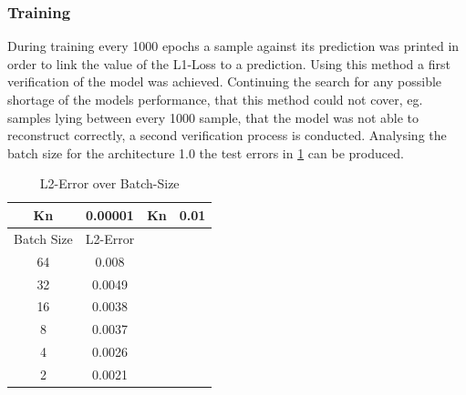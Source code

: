 \documentclass[12pt, a4paper]{article}
\begin{document}
\subsubsection{Training}
During training every 1000 epochs a sample against its prediction was printed in order to link the value of the L1-Loss to a prediction. Using this method a first verification of the model was achieved. Continuing the search for any possible shortage of the models performance, that this method could not cover, eg. samples lying between every 1000 sample, that the model was not able to reconstruct correctly, a second verification process is conducted.
Analysing the batch size for the architecture 1.0 the test errors in \cref{Tab:Batch} can be produced.
\begin{table}[!htbp]\centering
	\begin{tabular}{ |c c|c c| }
		\hline
		Kn & 0.00001& Kn &0.01  \\ [.5ex]
		\hline
		Batch Size & L2-Error && \\ \hline
		64 & 0.008  &&\\ 
		32 & 0.0049 &&\\ \hline
		16 & 0.0038 &&\\ \hline
		8 & 0.0037&&\\ \hline
		4 & 0.0026&&\\ \hline
		2 & 0.0021&&\\
		\hline
	\end{tabular}
	\caption{L2-Error over Batch-Size}
	\label{Tab:Batch}
\end{table}
\end{document}
